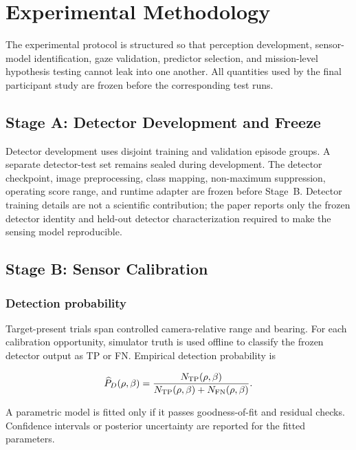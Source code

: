 \documentclass[conference]{IEEEtran}
\begin{document}
\section{Experimental Methodology}

The experimental protocol is structured so that perception development,
sensor-model identification, gaze validation, predictor selection, and
mission-level hypothesis testing cannot leak into one another. All quantities
used by the final participant study are frozen before the corresponding test
runs.

\subsection{Stage A: Detector Development and Freeze}

Detector development uses disjoint training and validation episode groups.
A separate detector-test set remains sealed during development. The detector
checkpoint, image preprocessing, class mapping, non-maximum suppression,
operating score range, and runtime adapter are frozen before Stage~B. Detector
training details are not a scientific contribution; the paper reports only the
frozen detector identity and held-out detector characterization required to
make the sensing model reproducible.

\subsection{Stage B: Sensor Calibration}

\subsubsection{Detection probability}

Target-present trials span controlled camera-relative range and bearing. For
each calibration opportunity, simulator truth is used offline to classify the
frozen detector output as TP or FN. Empirical detection probability is

\begin{equation}
\widehat P_D(\rho,\beta)=
\frac{N_{\rm TP}(\rho,\beta)}
{N_{\rm TP}(\rho,\beta)+N_{\rm FN}(\rho,\beta)}.
\label{eq:empirical_pd}
\end{equation}

A parametric model is fitted only if it passes goodness-of-fit and residual
checks. Confidence intervals or posterior uncertainty are reported for the
fitted parameters.
\end{document}
